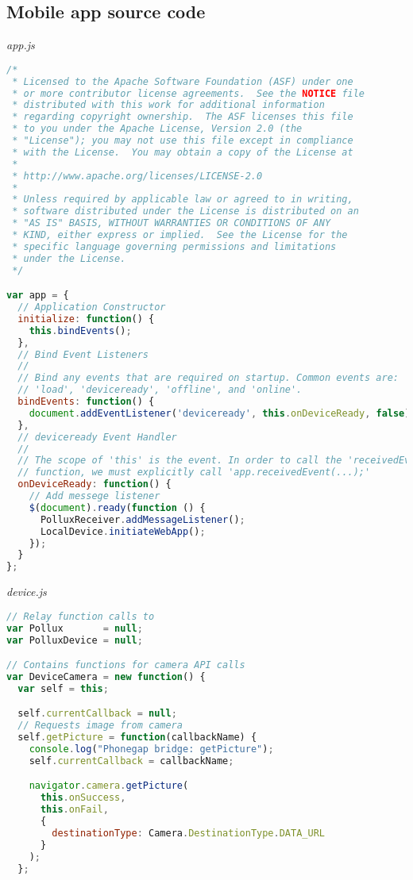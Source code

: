 \begin{appendices}
\section{Mobile app source code} \label{app:mobile-app-source-code-phonegap}
\emph{app.js}
\begin{lstlisting}[language=JavaScript]
/*
 * Licensed to the Apache Software Foundation (ASF) under one
 * or more contributor license agreements.  See the NOTICE file
 * distributed with this work for additional information
 * regarding copyright ownership.  The ASF licenses this file
 * to you under the Apache License, Version 2.0 (the
 * "License"); you may not use this file except in compliance
 * with the License.  You may obtain a copy of the License at
 *
 * http://www.apache.org/licenses/LICENSE-2.0
 *
 * Unless required by applicable law or agreed to in writing,
 * software distributed under the License is distributed on an
 * "AS IS" BASIS, WITHOUT WARRANTIES OR CONDITIONS OF ANY
 * KIND, either express or implied.  See the License for the
 * specific language governing permissions and limitations
 * under the License.
 */

var app = {
  // Application Constructor
  initialize: function() {
    this.bindEvents();  
  },
  // Bind Event Listeners
  //
  // Bind any events that are required on startup. Common events are:
  // 'load', 'deviceready', 'offline', and 'online'.
  bindEvents: function() {
    document.addEventListener('deviceready', this.onDeviceReady, false);
  },
  // deviceready Event Handler
  //
  // The scope of 'this' is the event. In order to call the 'receivedEvent'
  // function, we must explicitly call 'app.receivedEvent(...);'
  onDeviceReady: function() {
    // Add messege listener
    $(document).ready(function () {
      PolluxReceiver.addMessageListener();
      LocalDevice.initiateWebApp();
    });
  }
};
\end{lstlisting}
\emph{device.js}
\begin{lstlisting}[language=JavaScript]
// Relay function calls to
var Pollux       = null;
var PolluxDevice = null;

// Contains functions for camera API calls
var DeviceCamera = new function() {
  var self = this;

  self.currentCallback = null;
  // Requests image from camera
  self.getPicture = function(callbackName) {
    console.log("Phonegap bridge: getPicture");
    self.currentCallback = callbackName;

    navigator.camera.getPicture(
      this.onSuccess,
      this.onFail,
      {
        destinationType: Camera.DestinationType.DATA_URL
      }
    );
  };


\end{lstlisting}
\end{appendices}
